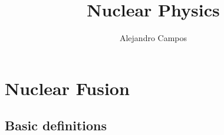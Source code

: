 \documentclass[a4paper,11pt]{report}
\title{Nuclear Physics}
\author{Alejandro Campos}
\begin{document}
\maketitle
\tableofcontents

\chapter{Nuclear Fusion}

\section{Basic definitions}
\end{document}
